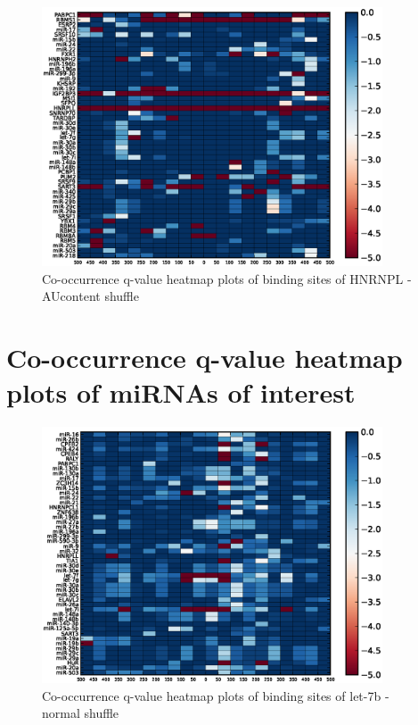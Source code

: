 \begin{figure}
   	\includegraphics[width=0.9\textwidth]{appendix1/figures/HNRNPL_AUcontent_expressed_heatmap_qvalues0.eps}
   	\caption{Co-occurrence q-value heatmap plots of binding sites of HNRNPL - AUcontent shuffle}
\end{figure}
\newpage
\clearpage
\section{Co-occurrence q-value heatmap plots of miRNAs of interest}
\clearpage
\begin{figure}
   	\includegraphics[width=0.9\textwidth,clip]{appendix1/figures/let-7b_normal_expressed_heatmap_qvalues0.eps}
   	\caption{Co-occurrence q-value heatmap plots of binding sites of let-7b - normal shuffle}
\end{figure}

